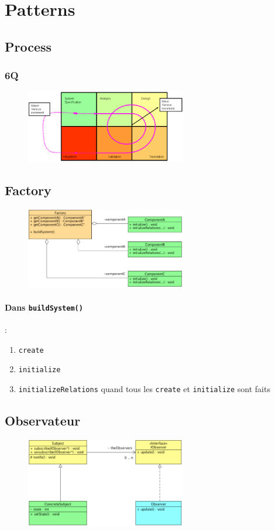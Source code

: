 \documentclass[resume]{subfiles}
\begin{document}
\section{Patterns}
\subsection{Process}
\subsubsection{6Q}
\begin{figure}[H]
\centering
\includegraphics[width=7.00cm]{img_3.png}
\end{figure}
\subsection{Factory}
\begin{figure}[H]
\centering
\includegraphics[width=7.00cm]{img_4.png}
\end{figure}
\paragraph{Dans \texttt{buildSystem()}} :
\begin{enumerate}
\item \verb!create!
\item \verb!initialize!
\item \verb!initializeRelations! quand tous les \verb!create! et \verb!initialize! sont faits
\end{enumerate}
\subsection{Observateur}
\begin{figure}[H]
\centering
\includegraphics[width=7.00cm]{img_5.png}
\end{figure}
\end{document}
